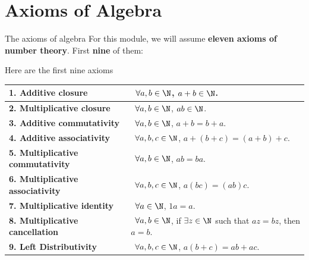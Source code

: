 \documentclass[11pt,aspectratio=1610,handout]{beamer}
\begin{document}
\section{Axioms of Algebra}

\begin{frame}{The axioms of algebra}	
		\hspace{-5mm} For this module, we will assume \textbf{eleven axioms of number theory}. First \textbf{nine} of them:\p
	\vspace{0mm}
	\renewcommand{\arraystretch}{1.35}
\begin{block}{Here are the first nine axioms}
	\begin{tabular}{l|l}
	\textbf{1. Additive closure}	&  \p ~$\forall a,b \in \N$, $a+b \in \N$. \p \\
		\hline 
	\textbf{2. Multiplicative closure}	&  \p ~$\forall a,b \in \N$, $a b \in \N$.\p \\
		\hline
	\textbf{3. Additive commutativity}	&  \p ~$\forall a,b \in \N$, $a+b = b+a$.\p \\
		\hline
	\textbf{4. Additive associativity}	&  \p ~$\forall a,b,c \in \N$, $a+(b+c) = (a+b)+c$.\p \\
		\hline
	\textbf{5. Multiplicative commutativity}	&  \p ~$\forall a,b \in \N$, $a b = b a$.\p \\
		\hline
	\textbf{6. Multiplicative associativity}	&   \p ~$\forall a,b,c \in \N$, $a(bc) = (ab)c$.\p \\
		\hline
	\textbf{7. Multiplicative identity}	&  \p ~$\forall a \in \N$, $1 a = a$.\p \\
		\hline
	\textbf{8. Multiplicative cancellation}	& \p  ~$\forall a, b \in \N$, if $\exists z \in \N$ such that $a z = b z$, then $a=b$.\p \\
	\hline
	\textbf{9. Left Distributivity}	&  \p ~$\forall a,b,c \in \N$, $a(b+c) = ab + ac$. 
	\end{tabular}
\end{block}		
	\renewcommand{\arraystretch}{1}
	
	
\end{frame}

%		
\end{document}
